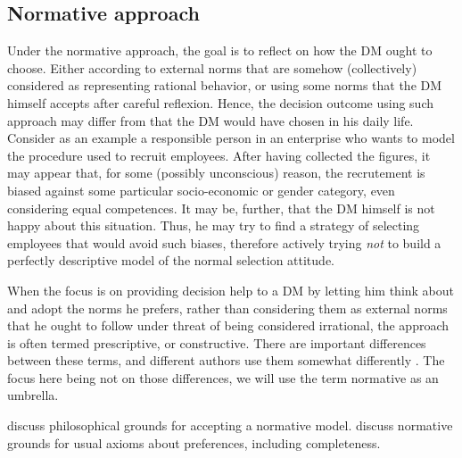 \documentclass[french, english]{llncs}
\begin{document}
	\subsection{Normative approach}
	Under the normative approach, the goal is to reflect on how the \ac{DM} ought to choose. Either according to external norms that are somehow (collectively) considered as representing rational behavior, or using some norms that the \ac{DM} himself accepts after careful reflexion. Hence, the decision outcome using such approach may differ from that the \ac{DM} would have chosen in his daily life. Consider as an example a responsible person in an enterprise who wants to model the procedure used to recruit employees. After having collected the figures, it may appear that, for some (possibly unconscious) reason, the recrutement is biased against some particular socio-economic or gender category, even considering equal competences. It may be, further, that the \ac{DM} himself is not happy about this situation. Thus, he may try to find a strategy of selecting employees that would avoid such biases, therefore actively trying \emph{not} to build a perfectly descriptive model of the normal selection attitude.
	
	When the focus is on providing decision help to a \ac{DM} by letting him think about and adopt the norms he prefers, rather than considering them as external norms that he ought to follow under threat of being considered irrational, the approach is often termed prescriptive, or constructive. There are important differences between these terms, and different authors use them somewhat differently \citep{roy_decision_1993, tsoukias_concept_2007}. The focus here being not on those differences, we will use the term normative as an umbrella.

 \citet{mcclennen_rationality_1990, guala_logic_2000} discuss philosophical grounds for accepting a normative model. \citet{anand_are_1987, mandler_difficult_2001} discuss normative grounds for usual axioms about preferences, including completeness.
	
\end{document}
